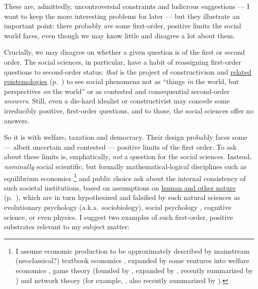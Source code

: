 These are, admittedly, uncontroversial constraints and ludicrous suggestions --- I want to keep the more interesting problems for later --- but they illustrate an important point:
there probably \emph{are} some first-order, positive limits the social world faces, even though we may know little and disagree a lot about them.

Crucially, we may disagree on whether a given question is of the first or second order.
The social sciences, in particular, have a habit of reassigning first-order questions to second-order status:
\emph{that} is the project of constructivism \citep[for example,][]{Berger1966} and \hyperref[itm:constructivism]{related epistemologies} (p.~\pageref{itm:constructivism}) to see social phenomena not as ``things \emph{in} the world, but perspectives \emph{on} the world'' \citep[174 on ethnicity, emphasis in the original]{Brubaker-2002-aa} or as contested and consequential second-order \emph{answers}.
Still, even a die-hard idealist or constructivist may concede some irreducibly positive, first-order questions, and to those, the social sciences offer no answers.

So it is with welfare, taxation and democracy.
Their design probably faces some --- albeit uncertain and contested --- positive limits of the first order.
To ask about these limits is, emphatically, \emph{not} a question for the social sciences.
Instead, \emph{nominally} social scientific, but formally mathematical-logical disciplines such as equilibrium economics
\footnote{
	I assume economic production to be approximately described by mainstream (neoclassical?) textbook economics \citep[including][]{Mankiw-2004-aa,FrankBernanke2004}, expanded by some ventures into welfare economics \citep{Hicks1939,Samuelson-1954-eu},  game theory (founded by \citealt{VonNeumannMorgenstern1944,Nash1951},  expanded by \citealt{Axelrod1981a}, recently summarized by \citealt{Kleinberg-2009-oz}) and network theory (for example, \citealt{Mandelbrot2004}, \citealt{Jackson1968} also recently summarized by \citealt{Kleinberg-2009-oz}).
}
and public choice ask about the internal consistency
of such societal institutions, based on assumptions on \hyperref[itm:a-posteriori]{human and other nature} (p.~\pageref{itm:a-posteriori}), which are in turn hypothesized and falsified by such natural sciences as evolutionary psychology (a.k.a.\ sociobiology), social psychology \citep[initially][]{KahnemanTversky1979}, cognitive science, or even physics.
I suggest two examples of such first-order, positive substrates relevant to my subject matter:

